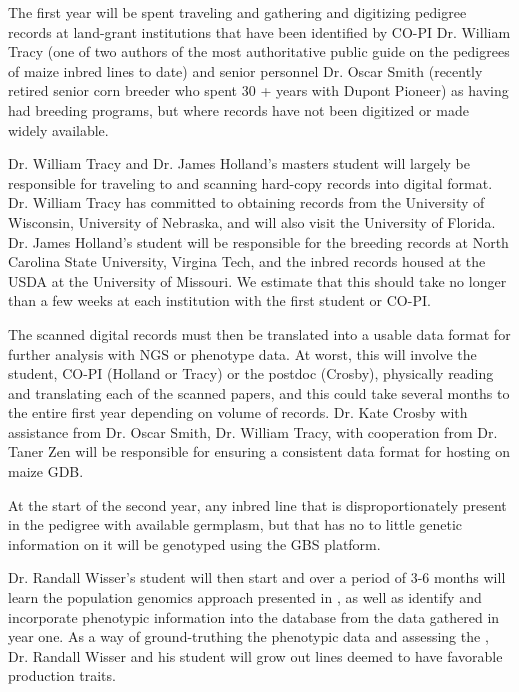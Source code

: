\documentclass[12pt]{article}
\begin{document}
The first year will be spent traveling and gathering and digitizing pedigree records at land-grant institutions that have been identified by CO-PI Dr. William Tracy (one of two authors of the most authoritative public guide on the pedigrees of maize inbred lines to date) and senior personnel Dr. Oscar Smith (recently retired senior corn breeder who spent 30 + years with Dupont Pioneer) as having had breeding programs, but where records have not been digitized or made widely available. 
\par Dr. William Tracy and Dr. James Holland's masters student will largely be responsible for traveling to and scanning hard-copy records into digital format. Dr. William Tracy has committed to obtaining records from the University of Wisconsin, University of Nebraska, and will also visit the University of Florida. 
Dr. James Holland's student will be responsible for the breeding records at North Carolina State University, Virgina Tech, and the inbred records housed at the USDA at the University of Missouri. We estimate that this should take no longer than a few weeks at each institution with the first student or CO-PI. 
\par The scanned digital records must then be translated into a usable data format for further analysis with NGS or phenotype data. At worst, this will involve the student, CO-PI (Holland or Tracy) or the postdoc (Crosby), physically reading and translating each of the scanned papers, and this could take several months to the entire first year depending on volume of records. 
Dr. Kate Crosby with assistance from Dr. Oscar Smith, Dr. William Tracy, with cooperation from Dr. Taner Zen will be responsible for ensuring a consistent data format for hosting on maize GDB.
\par At the start of the second year, any inbred line that is disproportionately present in the pedigree with available germplasm, but that has no to little genetic information on it will be genotyped using the GBS platform. 
\par Dr. Randall Wisser's student will then start and over a period of 3-6 months will learn the population genomics approach presented in \citep{Berg:2014bs}, as well as identify and incorporate phenotypic information into the database from the data gathered in year one. As a way of ground-truthing the phenotypic data and assessing the , Dr. Randall Wisser and his student will grow out lines deemed to have favorable production traits.





\end{document}
